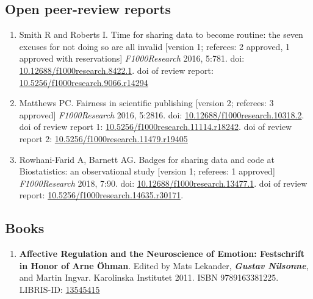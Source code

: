 \documentclass[10pt]{article}
\begin{document}
\subsection*{Open peer-review reports} \label{review reports}
\begin{enumerate}[nolistsep]
\item{Smith R and Roberts I. Time for sharing data to become routine: the seven excuses for not doing so are all invalid [version 1; referees: 2 approved, 1 approved with reservations] \emph{F1000Research} 2016, 5:781. doi: \href{http://dx.doi.org/10.12688/f1000research.8422.1}{10.12688/f1000research.8422.1}.
doi of review report: \href{http://dx.doi.org/10.5256/f1000research.9066.r14294}{10.5256/f1000research.9066.r14294}}
\item{Matthews PC. Fairness in scientific publishing [version 2; referees: 3 approved] \emph{F1000Research} 2016, 5:2816. doi: \href{http://dx.doi.org/10.12688/f1000research.10318.2}{10.12688/f1000research.10318.2}.
doi of review report 1: \href{http://dx.doi.org/10.5256/f1000research.11114.r18242}{10.5256/f1000research.11114.r18242}.
doi of review report 2: \href{http://dx.doi.org/10.5256/f1000research.11479.r19405}{10.5256/f1000research.11479.r19405}}
\item{Rowhani-Farid A, Barnett AG. Badges for sharing data and code at Biostatistics: an observational study [version 1; referees: 1 approved] \emph{F1000Research} 2018, 7:90. doi: \href{http://doi.org/10.12688/f1000research.13477.1}{10.12688/f1000research.13477.1}.
doi of review report: \href{http://doi.org/10.5256/f1000research.14635.r30171}{10.5256/f1000research.14635.r30171}.}
\end{enumerate}


\subsection*{Books}
\begin{enumerate}[nolistsep]
\item \textbf{Affective Regulation and the Neuroscience of Emotion: Festschrift in Honor of Arne Öhman}. Edited by Mats Lekander, \textbf{\textit{Gustav Nilsonne}}, and Martin Ingvar. Karolinska Institutet 2011. ISBN 9789163381225. LIBRIS-ID: \href{http://libris.kb.se/bib/13545415}{13545415}
\end{enumerate}
\end{document}
